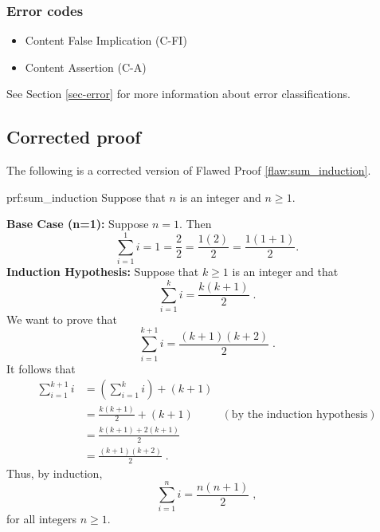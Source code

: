  
\subsubsection{Error codes}
\begin{itemize}
	\item 	Content False Implication (C-FI)
	\item   Content Assertion (C-A)
\end{itemize}
See Section \ref{sec-error} for more information about error classifications.

\clearpage
\subsection{Corrected proof}

The following is a corrected version of Flawed Proof \ref{flaw:sum_induction}. 

\begin{prf}{prf:sum_induction} 
Suppose that $n$ is an integer and $n\geq 1$.

\noindent \textbf{Base Case (n=1):} Suppose $n=1$. Then
$$\sum_{i=1}^1 i = 1 = \frac{2}{2} = \frac{1(2)}{2} = \frac{1(1+1)}{2}.$$ 
\textbf{Induction Hypothesis:} Suppose that $k \geq 1$ is an integer and that 
$$\sum_{i=1}^k i = \frac{k(k+1)}{2}\;.$$
We want to prove that 
$$\sum_{i=1}^{k+1} i = \frac{(k+1)(k+2)}{2}\;.$$
It follows that 
\begin{align*}
    \sum_{i=1}^{k+1} i &= \left(\sum_{i=1}^k i\right) + (k+1) \\
    &= \frac{k(k+1)}{2} + (k+1)  & (\text{by the induction hypothesis})\\
    &= \frac{k(k+1) + 2(k+1)}{2} \\
    &= \frac{(k+1)(k+2)}{2}\;.
\end{align*}
Thus, by induction, 
$$\sum_{i=1}^n i = \frac{n(n+1)}{2}\;,$$
 for all integers $n \geq 1.$
\end{prf}
